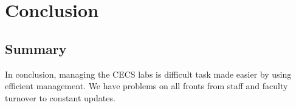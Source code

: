 \chapter{Conclusion} \label{ch:conclusion}
\section{Summary} \label{sec:summary}
In conclusion, managing the CECS labs is difficult task made easier by using efficient management. We have problems on all fronts from staff and faculty turnover to constant updates. 
